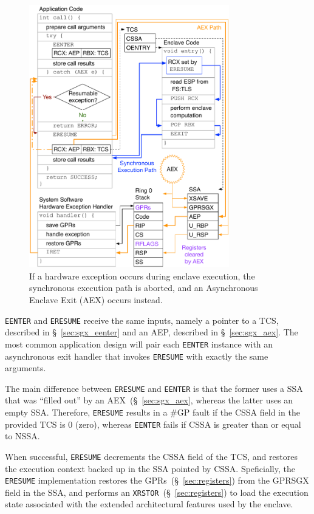 \begin{figure}[hbt]
  \centering
  \includegraphics[width=87mm]{figures/sgx_aex_eresume.pdf}
  \caption{
    If a hardware exception occurs during enclave execution, the synchronous
    execution path is aborted, and an Asynchronous Enclave Exit (AEX) occurs
    instead.
  }
  \label{fig:sgx_aex_eresume}
\end{figure}

\texttt{EENTER} and \texttt{ERESUME} receive the same inputs, namely a pointer
to a TCS, described in \S~\ref{sec:sgx_eenter} and an AEP, described in
\S~\ref{sec:sgx_aex}. The most common application design will pair each
\texttt{EENTER} instance with an asynchronous exit handler that invokes
\texttt{ERESUME} with exactly the same arguments.

The main difference between \texttt{ERESUME} and \texttt{EENTER} is that the
former uses a SSA that was ``filled out'' by an AEX~(\S~\ref{sec:sgx_aex},
whereas the latter uses an empty SSA. Therefore, \texttt{ERESUME} results in a
\#GP fault if the CSSA field in the provided TCS is 0 (zero), whereas
\texttt{EENTER} fails if CSSA is greater than or equal to NSSA.

When successful, \texttt{ERESUME} decrements the CSSA field of the TCS, and
restores the execution context backed up in the SSA pointed by CSSA.
Speficially, the \texttt{ERESUME} implementation restores the
GPRs~(\S~\ref{sec:registers}) from the GPRSGX field in the SSA, and performs an
\texttt{XRSTOR}~(\S~\ref{sec:registers}) to load the execution state
associated with the extended architectural features used by the enclave.

